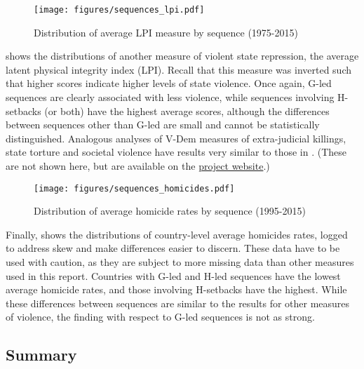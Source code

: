 \documentclass[12pt]{article}
\begin{document}
\begin{figure}[htbp]
    \centering
    \caption{Distribution of average LPI measure by sequence (1975-2015)}
    \label{sequences_lpi}
    \texttt{[image: figures/sequences\_lpi.pdf]}
\end{figure}

 shows the distributions of another measure of violent state repression, the average latent physical integrity index (LPI).
Recall that this measure was inverted such that higher scores indicate higher levels of state violence.
Once again, G-led sequences are clearly associated with less violence, while sequences involving H-setbacks (or both) have the highest average scores, although the differences between sequences other than G-led are small and cannot be statistically distinguished.
Analogous analyses of V-Dem measures of extra-judicial killings, state torture and societal violence have results very similar to those in . (These are not shown here, but are available on the \href{https://timothoms.github.io/LSC-MWG/sequencing.html}{project website}.)

\begin{figure}[htbp]
    \centering
    \caption{Distribution of average homicide rates by sequence (1995-2015)}
    \label{sequences_homicides}
    \texttt{[image: figures/sequences\_homicides.pdf]}
\end{figure}

Finally,  shows the distributions of country-level average homicides rates, logged to address skew and make differences easier to discern.
These data have to be used with caution, as they are subject to more missing data than other measures used in this report.
Countries with G-led and H-led sequences have the lowest average homicide rates, and those involving H-setbacks have the highest.
While these differences between sequences are similar to the results for other measures of violence, the finding with respect to G-led sequences is not as strong.

\subsection{Summary}
\end{document}
